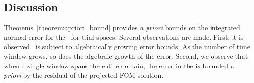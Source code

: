 \begin{comment}
$$ \intSlabArg{n} \norm{ \stateROMSolArgt{n}{t} - \stateROMStarSolArgt{n}{t}} = \DeltaSlabArg{n} \errorArgt{n}{\timeStartArg{n}}.$$
Inserting the above into~\eqref{eq:boundtmp},
\begin{equation*}
\intSlabArg{n} \norm{\errorArgt{n}{t}} dt \le \DeltaSlabArg{n} \norm{\errorArgt{n}{\timeStartArg{n}}  }   + \lipshitzi \intSlabArg{n} \norm{ \resid(\stateFOMProjSolArgt{n}{t}) } dt.
\end{equation*}
\end{proof}
\end{comment}
\subsection{Discussion} 
Theorems~\ref{theorem:apriori_bound} provides \textit{a priori} bounds on the integrated normed error for the \methodAcronymROM\ for \spatialAcronym trial spaces. Several 
observations are made. First, it is observed \methodAcronym\ is subject to algebraically growing error bounds. As the number of 
time window grows, so does the algebraic growth of the error. Second, we observe that when a single window spans the entire domain, the error in the \methodAcronymROM is bounded \textit{a priori} by the residual of the projected FOM solution. 
%

